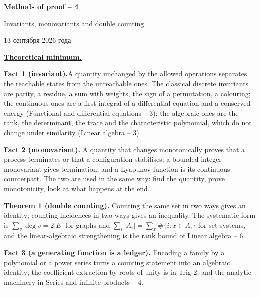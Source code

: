 \documentclass[11pt,a4paper]{article}
\newcommand{\head}[1]{\par\vspace{15pt}\noindent\textbf{\underline{#1}}\quad\ignorespaces}
\begin{document}
\begin{center}
{\huge\bfseries Methods of proof -- 4\par}\vspace{0.8em}
{\Large Invariants, monovariants and double counting\par}\vspace{0.8em}
{\foreignlanguage{russian}{13 сентября 2026 года}\par}
\end{center}\vspace{-3.3pt}

\noindent\textbf{\underline{Theoretical minimum.}}\par\vspace{10pt}
\noindent\textbf{\underline{Fact 1 (invariant).}}\quad A quantity unchanged by the allowed
operations separates the reachable states from the unreachable ones. The classical discrete
invariants are parity, a residue, a sum with weights, the sign of a permutation, a colouring; the
continuous ones are a first integral of a differential equation and a conserved energy
(Functional and differential equations -- 3); the algebraic ones are the rank, the determinant,
the trace and the characteristic polynomial, which do not change under similarity (Linear
algebra -- 3).

\head{Fact 2 (monovariant).} A quantity that changes monotonically proves that a process
terminates or that a configuration stabilises; a bounded integer monovariant gives termination,
and a Lyapunov function is its continuous counterpart. The two are used in the same way: find the
quantity, prove monotonicity, look at what happens at the end.

\head{Theorem 1 (double counting).} Counting the same set in two ways gives an identity; counting
incidences in two ways gives an inequality. The systematic form is $\sum_v\deg v=2|E|$ for graphs
and $\sum_i|A_i|=\sum_x\#\{i:x\in A_i\}$ for set systems, and the linear-algebraic strengthening
is the rank bound of Linear algebra -- 6.

\head{Fact 3 (a generating function is a ledger).} Encoding a family by a polynomial or a power
series turns a counting statement into an algebraic identity; the coefficient extraction by roots
of unity is in Trig-2, and the analytic machinery in Series and infinite products -- 4.

\medskip
\noindent\rule{\textwidth}{0.4pt}
\end{document}
